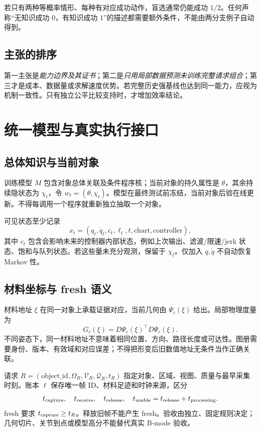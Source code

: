 \documentclass[11pt,a4paper,fontset=fandol]{ctexart}
\theoremstyle{definition}
\theoremstyle{remark}\newtheorem{remark}[theorem]{说明}
\numberwithin{equation}{section}
\begin{document}
若只有两种等概率情形、每种有对应成功动作，盲选通常仍能成功 $1/2$。任何声称“无知识成功 $0$，有知识成功 $1$”的描述都需要额外条件，不能由两分支例子自动得到。

\subsection{主张的排序}
第一主张是\emph{能力边界及其证书}；第二是\emph{只用局部数据预测未训练完整请求组合}；第三才是成本、数据量或求解速度优势。若完整历史强基线也达到同一能力，应视为机制一致性。只有独立公平比较支持时，才增加效率结论。

\section{统一模型与真实执行接口}
\label{sec:model}
\subsection{总体知识与当前对象}
训练模型 $M$ 包含对象总体关联及条件程序核；当前对象的持久属性是 $\theta$，其余持续隐状态为 $\chi_t$，令 $w_t=(\theta,\chi_t)$。模型在最终测试前冻结，当前对象后验在线更新。不得每调用一个程序就重新独立抽取一个对象。

可见状态至少记录
\begin{equation}
 x_t=(q_t,\dot q_t,c_t,\ell_t,t,\mathrm{chart},\mathrm{controller}),
 \label{eq:state}
\end{equation}
其中 $c_t$ 包含会影响未来的控制器内部状态，例如上次输出、滤波/限速/jerk 状态、饱和与队列状态。若这些量未充分观测，保留于 $\chi_t$。仅加入 $q,\dot q$ 不自动恢复 Markov 性。

\subsection{材料坐标与 fresh 语义}
材料地址 $\xi$ 在同一对象上承载证据对应，当前几何由 $\Psi_c(\xi)$ 给出。局部物理度量为
\begin{equation}
 G_c(\xi)=D\Psi_c(\xi)^\top D\Psi_c(\xi).
\end{equation}
不同姿态下，同一材料地址不意味着相同位置、方向、路径长度或可达性。图册需要身份、版本、有效域和对应误差；不得把形变后旧数值地址无条件当作正确关联。

请求 $R=(\mathrm{object\_id},\Omega_R,\mathcal V_R,\mathcal Q_R,t_R)$ 指定对象、区域、视图、质量与最早采集时刻。账本 $\ell$ 保存唯一帧 ID、材料足迹和时钟来源，区分
\begin{equation}
 t_{\rm capture},\quad t_{\rm receive},\quad t_{\rm release},\quad
 t_{\rm usable}=t_{\rm release}+t_{\rm processing}.
\end{equation}
fresh 要求 $t_{\rm capture}\ge t_R$。释放旧帧不能产生 fresh。验收由独立、固定规则决定；几何切片、关节到点或模型高分不能替代真实 B-mode 验收。
\end{document}
